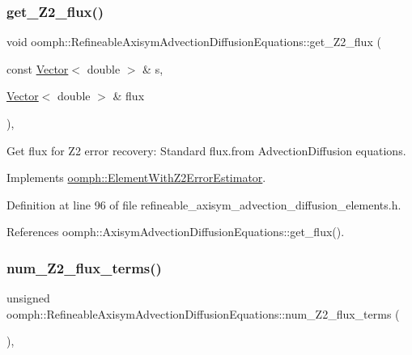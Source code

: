 \subsubsection{\texorpdfstring{get\+\_\+\+Z2\+\_\+flux()}{get\_Z2\_flux()}}
{\footnotesize\ttfamily void oomph\+::\+Refineable\+Axisym\+Advection\+Diffusion\+Equations\+::get\+\_\+\+Z2\+\_\+flux (\begin{DoxyParamCaption}\item[{const \hyperlink{classoomph_1_1Vector}{Vector}$<$ double $>$ \&}]{s,  }\item[{\hyperlink{classoomph_1_1Vector}{Vector}$<$ double $>$ \&}]{flux }\end{DoxyParamCaption})\hspace{0.3cm}{\ttfamily [inline]}, {\ttfamily [virtual]}}



Get \textquotesingle{}flux\textquotesingle{} for Z2 error recovery\+: Standard flux.\+from Advection\+Diffusion equations. 



Implements \hyperlink{classoomph_1_1ElementWithZ2ErrorEstimator_a5688ff5f546d81771cabad82ca5a7556}{oomph\+::\+Element\+With\+Z2\+Error\+Estimator}.



Definition at line 96 of file refineable\+\_\+axisym\+\_\+advection\+\_\+diffusion\+\_\+elements.\+h.



References oomph\+::\+Axisym\+Advection\+Diffusion\+Equations\+::get\+\_\+flux().

\mbox{\label{classoomph_1_1RefineableAxisymAdvectionDiffusionEquations_aaa412c73dd6158738d91c8a2f52df96e}} 
\subsubsection{\texorpdfstring{num\+\_\+\+Z2\+\_\+flux\+\_\+terms()}{num\_Z2\_flux\_terms()}}
{\footnotesize\ttfamily unsigned oomph\+::\+Refineable\+Axisym\+Advection\+Diffusion\+Equations\+::num\+\_\+\+Z2\+\_\+flux\+\_\+terms (\begin{DoxyParamCaption}{ }\end{DoxyParamCaption})\hspace{0.3cm}{\ttfamily [inline]}, {\ttfamily [virtual]}}



